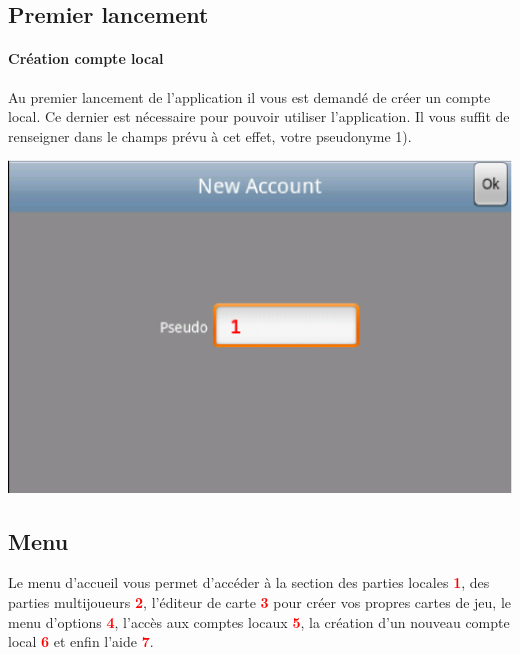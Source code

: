 

\subsection{Premier lancement}
	
		
	\paragraph{Création compte local\\}
	Au premier lancement de l'application il vous est demandé de créer un compte 
	local. Ce dernier est nécessaire pour pouvoir utiliser l'application. Il vous
	suffit de renseigner dans le champs prévu à cet effet, votre pseudonyme 1).
	\begin{center}
			\includegraphics[scale=0.6]{Manuel/Img/2.eps}
	\end{center}

	
\subsection{Menu}	
	Le menu d'accueil vous permet d'accéder à la section des parties locales
	\textcolor{red}{\textbf{1}}, des parties multijoueurs
	\textcolor{red}{\textbf{2}}, l'éditeur de carte \textcolor{red}{\textbf{3}}
	pour créer vos propres cartes de jeu, le menu d'options
	\textcolor{red}{\textbf{4}}, l'accès aux comptes locaux
	\textcolor{red}{\textbf{5}}, la création d'un nouveau compte local
	\textcolor{red}{\textbf{6}} et enfin l'aide \textcolor{red}{\textbf{7}}.
	
